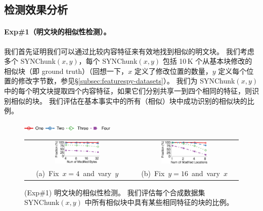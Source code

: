 \subsection{检测效果分析}
\label{subsec:featurespy-evaluation-detection}



\paragraph*{Exp\#1（明文块的相似性检测）。}
我们首先证明我们可以通过比较内容特征来有效地找到相似的明文块。 我们考虑多个 SYNChunk$(x, y)$，每个 SYNChunk$(x, y)$ 包括 10\,K 个从基本块修改的相似块（即 ground truth）（回想一下，$x$ 定义了修改位置的数量，$y$ 定义每个位置的修改字节数，参见\S\ref{subsec:featurespy-datasets}）。 我们为 SYNChunk$(x, y)$ 中的每个明文块提取四个内容特征，如果它们分别共享一到四个相同的特征，则识别相似的块。 我们评估在基本事实中的所有（相似）块中成功识别的相似块的比例。


\begin{figure}[t]
    \centering
    \includegraphics[width=0.4\textwidth]{pic/featurespy/plot/detection/syn/fixed_pq_legend.pdf}
    \vspace{5pt}\\
    \begin{tabular}{@{\ }c@{\ }c}
        \includegraphics[width=0.45\textwidth]{pic/featurespy/plot/detection/syn/fixed_p_4.pdf} &
        \includegraphics[width=0.45\textwidth]{pic/featurespy/plot/detection/syn/fixed_q_16.pdf}\\
        \mbox{\small (a) Fix $x=4$ and vary $y$}&
        \mbox{\small (b) Fix $y=16$ and vary $x$}\\
    \end{tabular}
    \vspace{-6pt}
    \caption{(Exp\#1) 明文块的相似性检测。 我们评估每个合成数据集 SYNChunk$(x, y)$ 中所有相似块中具有某些相同特征的块的比例。}
    \vspace{-6pt}
    \label{fig:featurespy-expDetectionSynSim}
\end{figure}

